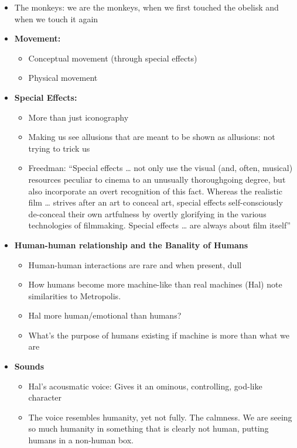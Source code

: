 \documentclass[11pt,fleqn]{book}
\begin{document}
\begin{itemize}
    \item The monkeys: we are the monkeys, when we first touched the obelisk and when we touch it again
    \item \textbf{Movement:}
    \begin{itemize}
        \item Conceptual movement (through special effects)
        \item Physical movement
    \end{itemize}
    \item \textbf{Special Effects:}
    \begin{itemize}
        \item More than just iconography
        \item Making us see allusions that are meant to be shown as allusions: not trying to trick us
        \item Freedman: \enquote{Special effects … not only use the visual
(and, often, musical) resources peculiar
to cinema to an unusually
thoroughgoing degree, but also
incorporate an overt recognition of this
fact. Whereas the realistic film … strives
after an art to conceal art, special
effects self-consciously de-conceal their
own artfulness by overtly glorifying in
the various technologies of filmmaking.
Special effects … are always about film
itself}
    \end{itemize}
    \item \textbf{Human-human relationship and the Banality of Humans}
    \begin{itemize}
        \item Human-human interactions are rare and when present, dull
        \item How humans become more machine-like than real machines (Hal) note similarities to Metropolis. 
        \item Hal more human/emotional than humans? 
        \item What's the purpose of humans existing if machine is more than what we are
    \end{itemize}
    \item \textbf{Sounds}
    \begin{itemize}
        \item Hal's acousmatic voice: Gives it an ominous, controlling, god-like character
        \item The voice resembles humanity, yet not fully. The calmness. We are seeing so much humanity in something that is clearly not human, putting humans in a non-human box. 

\end{itemize}
\end{itemize}
\end{document}
